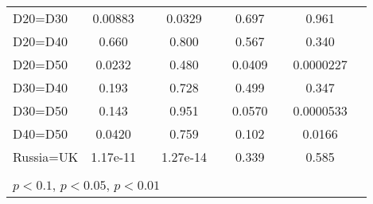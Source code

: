 \begin{tabular}{l|cccccc|cc}
D20=D30         &  0.00883         &         &   0.0329         &         &    0.697         &         &    0.961         &         \\
D20=D40         &    0.660         &         &    0.800         &         &    0.567         &         &    0.340         &         \\
D20=D50         &   0.0232         &         &    0.480         &         &   0.0409         &         &0.0000227         &         \\
D30=D40         &    0.193         &         &    0.728         &         &    0.499         &         &    0.347         &         \\
D30=D50         &    0.143         &         &    0.951         &         &   0.0570         &         &0.0000533         &         \\
D40=D50         &   0.0420         &         &    0.759         &         &    0.102         &         &   0.0166         &         \\
Russia=UK       & 1.17e-11         &         & 1.27e-14         &         &    0.339         &         &    0.585         &         \\
\hline\hline
\multicolumn{9}{p{16cm}}{\tiny }\\
\multicolumn{9}{l}{\tiny \sym{*} \(p<0.1\), \sym{**} \(p<0.05\), \sym{***} \(p<0.01\)}\\
\end{tabular}